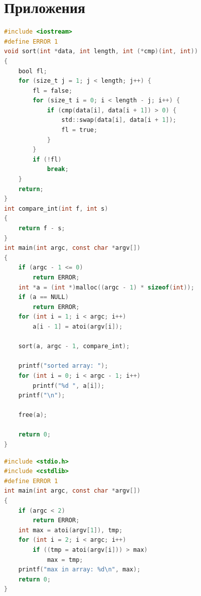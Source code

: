 \documentclass[12pt]{report}
\begin{document}
\section*{Приложения}
\begin{lstlisting}[label=sort,caption=Сортировка,language=C]
#include <iostream>
#define ERROR 1
void sort(int *data, int length, int (*cmp)(int, int))
{
    bool fl;
    for (size_t j = 1; j < length; j++) {
        fl = false;
        for (size_t i = 0; i < length - j; i++) {
            if (cmp(data[i], data[i + 1]) > 0) {
                std::swap(data[i], data[i + 1]);
                fl = true;
            }
        }
        if (!fl)
            break;
    }
    return;
}
int compare_int(int f, int s)
{
    return f - s;
}
int main(int argc, const char *argv[])
{
    if (argc - 1 <= 0)
        return ERROR;
    int *a = (int *)malloc((argc - 1) * sizeof(int));
    if (a == NULL)
        return ERROR;
    for (int i = 1; i < argc; i++)
        a[i - 1] = atoi(argv[i]);

    sort(a, argc - 1, compare_int);

    printf("sorted array: ");
    for (int i = 0; i < argc - 1; i++)
        printf("%d ", a[i]);
    printf("\n");

    free(a);

    return 0;
}
\end{lstlisting}
\newpage
\begin{lstlisting}[label=max,caption=Поиск максимума,language=C]
#include <stdio.h>
#include <cstdlib>
#define ERROR 1
int main(int argc, const char *argv[])
{
    if (argc < 2)
        return ERROR;
    int max = atoi(argv[1]), tmp;
    for (int i = 2; i < argc; i++)
        if ((tmp = atoi(argv[i])) > max)
            max = tmp;
    printf("max in array: %d\n", max);
    return 0;
}

\end{lstlisting}
\end{document}
